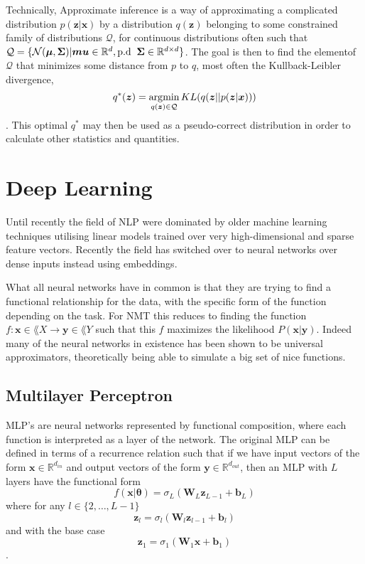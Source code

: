 Technically, Approximate inference is a way of approximating
a complicated distribution $p(\bm{z} | \bm{x})$ by a distribution $q(\bm{z})$ belonging
to some constrained family of distributions $\mathcal{Q}$, for continuous
distributions often such that $\mathcal{Q} = \{\mathcal{N}(\bm{\mu},
\bm{\Sigma}) | \bm{mu} \in \mathbb{R}^d, \text{p.d \:} \bm{\Sigma} \in
\mathbb{R}^{d \times d}\}$. The goal is then to find the elementof $\mathcal{Q}$
that minimizes some distance from $p$ to $q$, most often the Kullback-Leibler
divergence,
\begin{equation}
  \label{eq:AI_optimal_element}
  q^*(\bm{z}) = \operatorname*{\arg\!\min}_{q(\bm{z}) \in \mathcal{Q}} KL(q(\bm{z} || p(\bm{z} | \bm{x})))
\end{equation}.
This optimal $q^*$ may then be used as a pseudo-correct
distribution in order to calculate other statistics and quantities.

\section{Deep Learning}
Until recently the field of NLP were dominated by older machine learning
techniques utilising linear models trained over very high-dimensional and sparse
feature vectors. Recently the field has switched over to neural networks over
dense inputs instead using embeddings\cite[p.~1 - 2]{goldberg2015primer}.

What all neural networks have in common is that they are trying to find a
functional relationship for the data, with the specific form of the function
depending on the task. For NMT this reduces to finding the function $f : \bm{x}
\in \lang{X} \to \bm{y} \in \lang{Y}$ such that this $f$ maximizes the
likelihood $P(\bm{x} | \bm{y})$. Indeed many of the neural networks in existence
has been shown to be universal approximators, theoretically being able to
simulate a big set of nice functions\cite{Hornik:1989:MFN:70405.70408}.

\subsection{Multilayer Perceptron}
MLP's are neural networks represented by functional composition, where each
function is interpreted as a layer of the network. The original MLP can be defined in
terms of a recurrence relation such that if we have input vectors of the form $\bm{x} \in
\mathbb{R}^{d_{in}}$ and output vectors of the form $\bm{y} \in
\mathbb{R}^{d_{out}}$, then an MLP with $L$ layers have the functional form
\begin{equation}
  f(\bm{x} | \bm{\theta}) = \sigma_L(\bm{W}_L \bm{z}_{L-1} + \bm{b}_{L})
\end{equation}
where for any $l \in \{2, \dots, L-1\}$
\begin{equation}
    \bm{z}_l = \sigma_l(\bm{W}_l \bm{z}_{l-1} + \bm{b}_l)
\end{equation}
and with the base case
\begin{equation}
  \bm{z}_1 = \sigma_1(\bm{W}_1 \bm{x} + \bm{b}_1)
\end{equation}.

